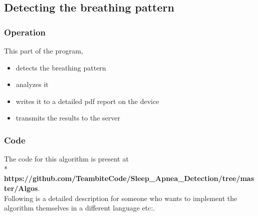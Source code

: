 \documentclass{report}
\begin{document}
\subsection{Detecting the breathing pattern}
\subsubsection{Operation}
This part of the program,
\begin{itemize}
    \item detects the breathing pattern
    \item analyzes it
    \item writes it to a detailed pdf report on the device
    \item transmits the results to the server
\end{itemize}
\subsubsection{Code}
The code for this algorithm is present at\\*
\textbf{https://github.com/TeambiteCode/Sleep\_Apnea\_Detection/tree/master/Algos}.\\
Following is a detailed description for someone who wants to implement the algorithm themselves in a different language etc:.\\
\end{document}
